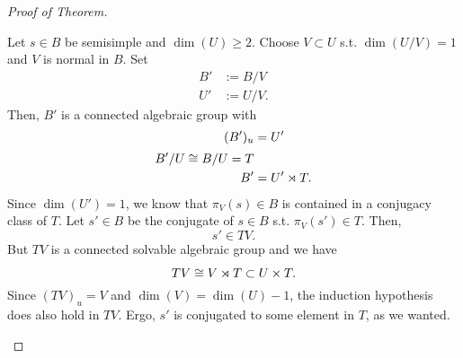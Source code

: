 \begin{proof}[Proof of Theorem]
\begin{itemize}
Let $s \in B$ be semisimple and $\dim(U) \geq 2$. Choose $V \subset U$ s.t. $\dim(U / V) = 1$ and $V$ is normal in $B$. Set
\begin{align*}
B' &:= B/V\\
U' &:= U/V.
\end{align*}
Then, $B'$ is a connected algebraic group with
\begin{align*}
(B')_u &= U'\\
B' / U \overset{}{\cong} B/U = T\\
B' &= U' \rtimes T.
\end{align*}
Since $\dim(U') = 1$, we know that $\pi_V(s) \in B$ is contained in a conjugacy class of $T$.
Let $s'\in B$ be the conjugate of $s \in B$ s.t. $\pi_V(s') \in T$. Then,
\[ s' \in TV. \]
But $TV$ is a connected solvable algebraic group and we have
\[ TV \overset{}{\cong} V \rtimes T \subset U \times T. \]
Since $(TV)_u = V$ and $\dim(V) = \dim(U) - 1$, the induction hypothesis does also hold in $TV$. Ergo, $s'$ is conjugated to some element in $T$, as we wanted.
	\end{itemize}
\end{proof}


